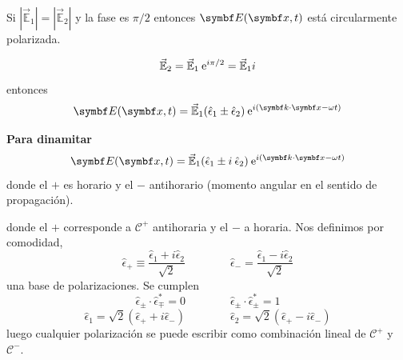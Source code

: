 \documentclass[10pt,oneside]{CBFT_book}
\begin{document}
Si $|\vec{\mathbb{E}}_1|=|\vec{\mathbb{E}}_2|$ y la fase es $\pi/2$ entonces $\vb{E}( \vb{x},t )$ está circularmente 
polarizada.

\[
	\vec{\mathbb{E}}_2 = \vec{\mathbb{E}}_1 \:\mathrm{e}^{i \pi/2} =\vec{\mathbb{E}}_1 i
\]
entonces
\[
	\vb{E}( \vb{x},t )= \vec{\mathbb{E}}_1 (\hat{\epsilon}_1  \pm \hat{\epsilon}_2 )
				\euler^{i( \pe{k}{x} -\omega t)}	
\]
\begin{ejemplo}{\bf Para dinamitar}
\[
 	\vb{E}( \vb{x},t )= \vec{\mathbb{E}}_1 (\hat{\epsilon}_1 \pm i \: \hat{\epsilon}_2 )
				\euler^{i( \pe{k}{x} -\omega t)}
\]
donde el $+$ es horario y el $-$ antihorario (momento angular en el sentido de propagación).
\end{ejemplo}
donde el $+$ corresponde a $\mathcal{C}^+$ antihoraria y el $-$ a horaria. Nos definimos por comodidad,
\[
	\hat{\epsilon}_+ \equiv \frac{\hat{\epsilon}_1 + i \hat{\epsilon}_2 }{\sqrt{2}} \qquad\qquad 
	\hat{\epsilon}_- = \frac{\hat{\epsilon}_1 - i \hat{\epsilon}_2 }{\sqrt{2}}
\]
una base de polarizaciones. Se cumplen
\[
	\hat{\epsilon}_\pm \cdot \hat{\epsilon}_\mp^* = 0 \qquad \qquad 
	\hat{\epsilon}_\pm \cdot \hat{\epsilon}_\pm^* = 1
\]
\[
	\hat{\epsilon}_1 = \sqrt{2}( \hat{\epsilon}_+ + i \hat{\epsilon}_- ) \qquad \qquad 
	\hat{\epsilon}_2 = \sqrt{2}( \hat{\epsilon}_+ - i \hat{\epsilon}_- )
\]
luego cualquier polarización se puede escribir como combinación lineal de $\mathcal{C}^+$ y $\mathcal{C}^-$.
\end{document}
